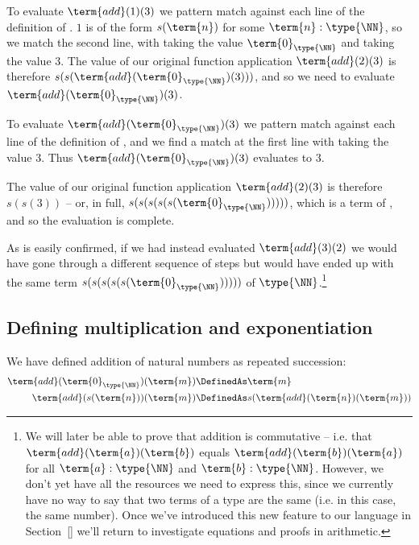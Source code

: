 To evaluate
$\term{add}(1)(3)$ we pattern match against each line of the definition of .  $1$ is of the form $s(\term{n})$ for some $\term{n}:\type{\NN}$, so we match the second line, with  taking the value $\term{0}_{\type{\NN}}$ and  taking the value $3$.  The value of our original function application $\term{add}(2)(3)$ is therefore 
$s(s(\term{add}(\term{0}_{\type{\NN}})(3)))$, and so we need to evaluate $\term{add}(\term{0}_{\type{\NN}})(3)$.

To evaluate
$\term{add}(\term{0}_{\type{\NN}})(3)$ we pattern match against each line of the definition of , and we find a match at the first line with  taking the value $3$.  Thus $\term{add}(\term{0}_{\type{\NN}})(3)$ evaluates to $3$.

The value of our original function application $\term{add}(2)(3)$ is therefore $s(s(3))$ -- or, in full, 
$s(s(s(s(s(\term{0}_{\type{\NN}})))))$, 
which is a term of \type{\NN}, and so the evaluation is complete.

As is easily confirmed, if we had instead evaluated $\term{add}(3)(2)$ we would have gone through a different sequence of steps but would have ended up with the same term $s(s(s(s(s(\term{0}_{\type{\NN}})))))$ of $\type{\NN}$.\footnote{We will later be able to prove that addition is commutative -- i.e. that $\term{add}(\term{a})(\term{b})$ equals $\term{add}(\term{b})(\term{a})$ for all $\term{a}:\type{\NN}$ and $\term{b}:\type{\NN}$.  However, we don't yet have all the resources we need to express this, since we currently have no way to say that two terms of a type are the same (i.e. in this case, the same number).  Once we've introduced this new feature to our language in Section~\ref{} we'll return to investigate equations and proofs in arithmetic.
}
 

\subsection{Defining multiplication and exponentiation}
\label{sec:NaturalNumbers-MultiplicationExponentiation}

We have defined addition of natural numbers as repeated succession:
\begin{align*}
\term{add}(\term{0}_{\type{\NN}})(\term{m}) &\DefinedAs \term{m}
\\
\term{add}(s(\term{n}))(\term{m}) &\DefinedAs
s(\term{add}(\term{n})(\term{m}))
\end{align*}

